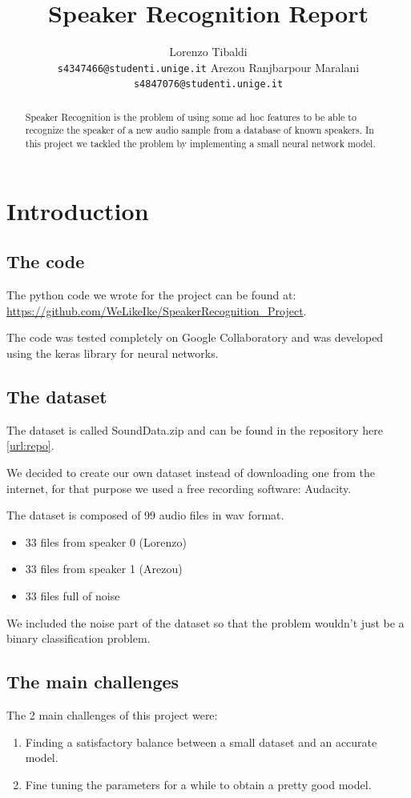 \documentclass{article}
\title{Speaker Recognition Report}
\author{
	Lorenzo Tibaldi\\
	\texttt{s4347466@studenti.unige.it}
	\AND 
	Arezou Ranjbarpour Maralani\\
  	\texttt{s4847076@studenti.unige.it}}
\begin{document}
\maketitle
\begin{abstract}
Speaker Recognition is the problem of using some ad hoc features 
to be able to recognize the speaker of a new audio sample from a database of known speakers.
In this project we tackled the problem by implementing a small neural network model.
\end{abstract}

\section{Introduction}
	\subsection{The code}
	The python code we wrote for the project can be found at: \url{https://github.com/WeLikeIke/SpeakerRecognition_Project}.\label{url:repo}

	The code was tested completely on Google Collaboratory and was developed using the keras library for neural networks.

	\subsection{The dataset}
	The dataset is called SoundData.zip and can be found in the repository here \ref{url:repo}.

	We decided to create our own dataset instead of downloading one from the internet, for that purpose we used a free recording software: Audacity.

	The dataset is composed of 99 audio files in wav format.
	\begin{itemize}
	\item 33 files from speaker 0 (Lorenzo)
	\item 33 files from speaker 1 (Arezou)
	\item 33 files full of noise
	\end{itemize}
	We included the noise part of the dataset so that the problem wouldn't just be a binary classification problem.

	\subsection{The main challenges}
	The 2 main challenges of this project were:
	\begin{enumerate}
	\item Finding a satisfactory balance between a small dataset and an accurate model.
	\item Fine tuning the parameters for a while to obtain a pretty good model.
	\end{enumerate}
\end{document}
